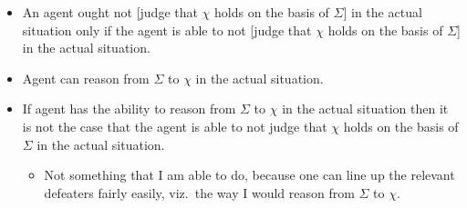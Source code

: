 \documentclass[10pt]{article}
\begin{document}
\begin{itemize}
\item An agent ought not [judge that \(\chi\) holds on the basis of \(\Sigma\)] in the actual situation only if the agent is able to not [judge that \(\chi\) holds on the basis of \(\Sigma\)] in the actual situation.
\item Agent can reason from \(\Sigma\) to \(\chi\) in the actual situation.
\item If agent has the ability to reason from \(\Sigma\) to \(\chi\) in the actual situation then it is not the case that the agent is able to not judge that \(\chi\) holds on the basis of \(\Sigma\) in the actual situation.
  \begin{itemize}
  \item Not something that I am able to do, because one can line up the relevant defeaters fairly easily, viz.\ the way I would reason from \(\Sigma\) to \(\chi\).
  \end{itemize}
\end{itemize}
\end{document}
